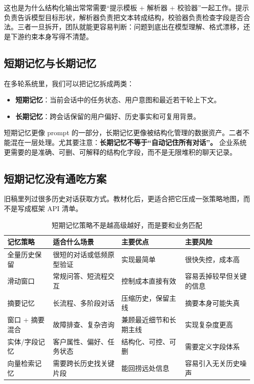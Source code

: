 这也是为什么结构化输出常常需要“提示模板 + 解析器 + 校验器”一起工作。提示负责告诉模型目标形状，解析器负责把文本转成结构，校验器负责检查字段是否合法。三者一旦拆开，团队就能更容易判断：问题到底出在模型理解、格式漂移，还是下游约束本身写得不清楚。

\subsection{短期记忆与长期记忆}
在多轮系统里，我们可以把记忆拆成两类：
\begin{itemize}
  \item \textbf{短期记忆}：当前会话中的任务状态、用户意图和最近若干轮上下文。
  \item \textbf{长期记忆}：跨会话保留的用户偏好、历史事实和可复用背景。
\end{itemize}

短期记忆更像 prompt 的一部分，长期记忆更像被结构化管理的数据资产。二者不能混在一层处理。尤其要注意：\textbf{长期记忆不等于“自动记住所有对话”。} 企业系统更需要的是准确、可删、可解释的结构化字段，而不是无限堆积的聊天记录。

\subsection{短期记忆没有通吃方案}
旧稿里列过很多历史对话获取方式。教材化后，更适合把它压成一张策略地图，而不是写成框架 API 清单。

\begin{table}[H]
\centering
\small
\begin{tabularx}{\textwidth}{>{\raggedright\arraybackslash}p{3cm}>{\raggedright\arraybackslash}p{3.3cm}>{\raggedright\arraybackslash}p{3cm}>{\raggedright\arraybackslash}X}
\toprule
\textbf{记忆策略} & \textbf{适合什么场景} & \textbf{主要优点} & \textbf{主要风险} \\
\midrule
全量历史保留 & 很短的对话或低频原型验证 & 实现最简单 & 很快失控，成本高 \\
滑动窗口 & 常规问答、短流程交互 & 控制成本直接有效 & 容易丢掉较早但关键的信息 \\
摘要记忆 & 长流程、多阶段对话 & 压缩历史，保留主线 & 摘要本身可能失真 \\
窗口 + 摘要混合 & 故障排查、复杂咨询 & 兼顾最近细节和长期主线 & 实现复杂度更高 \\
实体/字段记忆 & 客户属性、偏好、任务状态 & 结构化、可控、可删 & 需要定义字段体系 \\
向量检索记忆 & 需要跨长历史找关键片段 & 能回捞远处信息 & 容易引入无关历史噪声 \\
\bottomrule
\end{tabularx}
\caption{短期记忆策略不是越高级越好，而是要和业务匹配}
\label{tab:memory-strategies}
\end{table}

